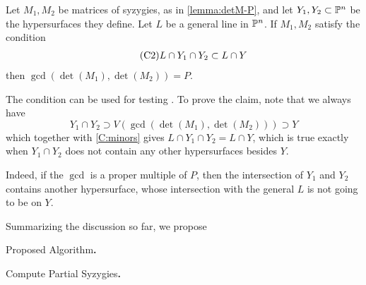 \documentclass[fleqn,reqno]{amsart}
\begin{document}
\begin{paragraf}
\label{par:intersect-general-line}
Let $M_1,M_2$ be matrices of syzygies, as in \eqref{lemma:detM-P},
and let $Y_1,Y_2\subset\mathbb{P}^n$ be the hypersurfaces they define.
Let $L$ be a general line in $\mathbb{P}^n$.
If $M_1,M_2$ satisfy the condition
\begin{align}
	\label{C:minors}
	\tag{C2}
	L\cap Y_1\cap Y_2\subset L\cap Y
\end{align}
then $\gcd(\det(M_1),\det(M_2))=P$.

The condition can be used for testing .
To prove the claim, note that we always have
\[
	Y_1\cap Y_2\supset V(\gcd(\det(M_1),\det(M_2)))\supset Y
\]
which together with \eqref{C:minors} gives $L\cap Y_1\cap Y_2=L\cap Y$,
which is true exactly when $Y_1\cap Y_2$ does not contain any other hypersurfaces besides $Y$.

Indeed, if the $\gcd$ is a proper multiple of $P$, then the intersection of
$Y_1$ and $Y_2$ contains another hypersurface, whose intersection with the general $L$
is not going to be on $Y$.
\end{paragraf}

\begin{paragraf*}
Summarizing the discussion so far, we propose
\end{paragraf*}

\begin{algorithm}{\sc Proposed Algorithm}{\bf.}
\label{algo:proposed}
\begin{algorithmic}
\State{}
\EndWhile
{}
\end{algorithmic}
\end{algorithm}

\begin{algorithm}{\sc Compute Partial Syzygies}{\bf.}
\label{algo:compute-Ni}
\begin{algorithmic}
\EndFor
{}
\end{algorithmic}
\end{algorithm}
\end{document}
